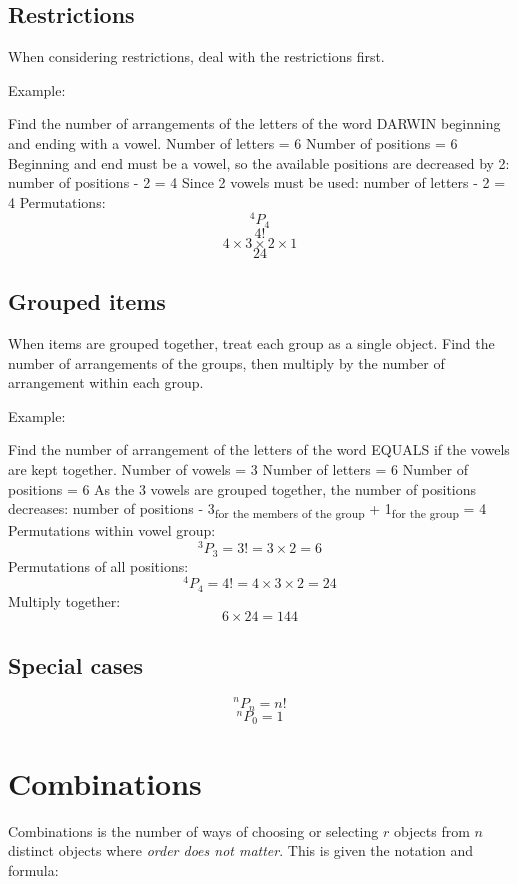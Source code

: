 \documentclass{book}
\begin{document}
\section{Restrictions}
When considering restrictions, deal with the restrictions first.

Example:

\begin{center}
	Find the number of arrangements of the letters of the word DARWIN beginning and ending with a vowel.
	Number of letters = 6
	Number of positions = 6
	Beginning and end must be a vowel, so the available positions are decreased by 2: number of positions - 2 = 4
	Since 2 vowels must be used:  number of letters - 2 = 4
	Permutations:
	\[^4P_4\]
	\[4!\]
	\[4 \times 3 \times 2 \times 1\]
	\[24\]
\end{center}



\section{Grouped items}
When items are grouped together, treat each group as a single object.  Find the number of arrangements of the groups, then multiply by the number of arrangement within each group.

Example:

\begin{center}
	Find the number of arrangement of the letters of the word EQUALS if the vowels are kept together.
	Number of vowels = 3
	Number of letters = 6
	Number of positions = 6
	As the 3 vowels are grouped together, the number of positions decreases:
	number of positions - 3\textsubscript{for the members of the group} + 1\textsubscript{for the group} = 4
	Permutations within vowel group:
	\[^3P_3 = 3! = 3 \times 2 = 6\]
	Permutations of all positions:
	\[^4P_4 = 4! = 4 \times 3 \times 2 = 24\]
	Multiply together:
	\[6 \times 24 = 144\]
\end{center}



\section{Special cases}
\[^nP_n = n!\]
\[^nP_0 = 1\]




\chapter{Combinations}
Combinations is the number of ways of choosing or selecting $r$ objects from $n$ distinct objects where \emph{order does not matter}.  This is given the notation and formula:
\end{document}
